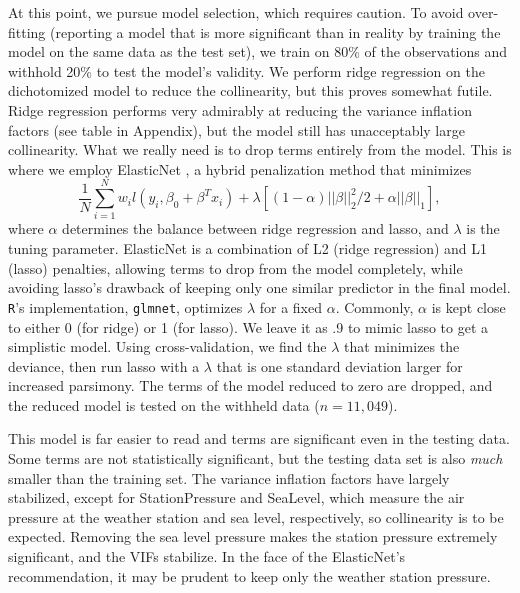 \documentclass[12pt]{article}
\begin{document}
At this point, we pursue model selection, which requires caution. To avoid over-fitting (reporting a model that is more significant than in reality by training the model on the same data as the test set), we train on 80\% of the observations and withhold 20\% to test the model's validity. We perform ridge regression on the dichotomized model to reduce the collinearity, but this proves somewhat futile. Ridge regression performs very admirably at reducing the variance inflation factors (see table in Appendix), but the model still has unacceptably large collinearity. What we really need is to drop terms entirely from the model. This is where we employ ElasticNet \cite{zou2005regularization}, a hybrid penalization method that minimizes
\[ \frac{1}{N} \sum_{i=1}^{N} w_i l(y_i,\beta_0+\beta^T x_i) + \lambda\left[(1-\alpha)||\beta||_2^2/2 + \alpha ||\beta||_1\right], \]
where $\alpha$ determines the balance between ridge regression and lasso, and $\lambda$ is the tuning parameter. ElasticNet is a combination of L2 (ridge regression) and L1 (lasso) penalties, allowing terms to drop from the model completely, while avoiding lasso's drawback of keeping only one similar predictor in the final model. \verb+R+'s implementation, \verb+glmnet+, optimizes $\lambda$ for a fixed $\alpha$. Commonly, $\alpha$ is kept close to either 0 (for ridge) or 1 (for lasso). We leave it as .9 to mimic lasso to get a simplistic model. Using cross-validation, we find the $\lambda$ that minimizes the deviance, then run lasso with a $\lambda$ that is one standard deviation larger for increased parsimony. The terms of the model reduced to zero are dropped, and the reduced model is tested on the withheld data ($n=11,049$).

This model is far easier to read and terms are significant even in the testing data. Some terms are not statistically significant, but the testing data set is also \emph{much} smaller than the training set. The variance inflation factors have largely stabilized, except for StationPressure and SeaLevel, which measure the air pressure at the weather station and sea level, respectively, so collinearity is to be expected. Removing the sea level pressure makes the station pressure extremely significant, and the VIFs stabilize. In the face of the ElasticNet's recommendation, it may be prudent to keep only the weather station pressure.
\end{document}
